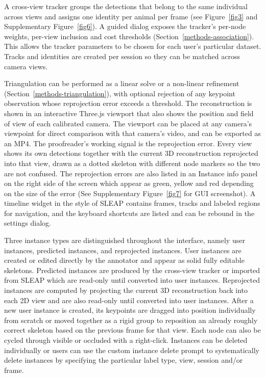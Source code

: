 \documentclass[pdflatex, sn-nature]{sn-jnl}
\theoremstyle{thmstyleone}%
\theoremstyle{thmstyletwo}%
\theoremstyle{thmstylethree}%
\begin{document}
A cross-view tracker groups the detections that belong to the same individual across views and assigns one identity per animal per frame (see Figure~\ref{fig3} and Supplementary Figure~\ref{fig6}). A guided dialog exposes the tracker's per-node weights, per-view inclusion and cost thresholds (Section~\ref{methods-association}). This allows the tracker parameters to be chosen for each user's particular dataset. Tracks and identities are created per session so they can be matched across camera views.

Triangulation can be performed as a linear solve or a non-linear refinement (Section~\ref{methods-triangulation}), with optional rejection of any keypoint observation whose reprojection error exceeds a threshold. The reconstruction is shown in an interactive Three.js viewport that also shows the position and field of view of each calibrated camera. The viewport can be placed at any camera's viewpoint for direct comparison with that camera's video, and can be exported as an MP4. The proofreader's working signal is the reprojection error. Every view shows its own detections together with the current 3D reconstruction reprojected into that view, drawn as a dotted skeleton with different node markers so the two are not confused. The reprojection errors are also listed in an Instance info panel on the right side of the screen which appear as green, yellow and red depending on the size of the error (See Supplementary Figure~\ref{fig7} for GUI screenshot). A timeline widget in the style of SLEAP contains frames, tracks and labeled regions for navigation, and the keyboard shortcuts are listed and can be rebound in the settings dialog.

Three instance types are distinguished throughout the interface, namely user instances, predicted instances, and reprojected instances. User instances are created or edited directly by the annotator and appear as solid fully editable skeletons. Predicted instances are produced by the cross-view tracker or imported from SLEAP which are read-only until converted into user instances. Reprojected instances are computed by projecting the current 3D reconstruction back into each 2D view and are also read-only until converted into user instances. After a new user instance is created, its keypoints are dragged into position individually from scratch or moved together as a rigid group to reposition an already roughly correct skeleton based on the previous frame for that view. Each node can also be cycled through visible or occluded with a right-click. Instances can be deleted individually or users can use the custom instance delete prompt to systematically delete instances by specifying the particular label type, view, session and/or frame.
\end{document}
